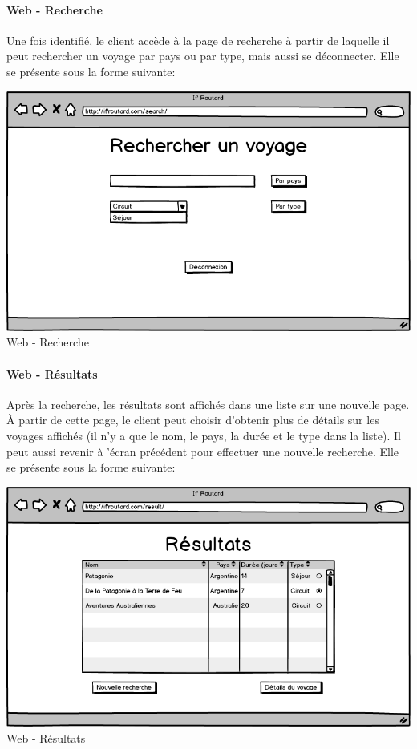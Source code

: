 \documentclass[11pt]{article}
\begin{document}
\paragraph{Web - Recherche}
Une fois identifié, le client accède à la page de recherche à partir de laquelle il peut rechercher un voyage par pays ou par type, mais aussi se déconnecter. Elle se présente sous la forme suivante:
\begin{center}
\includegraphics[scale = 0.4]{../Conception_graphique/png_Pour_CR/Web-20-Recherche.png}
\newline
Web - Recherche
\label{fig:Recherche}
\end{center}

\paragraph{Web - Résultats}
Après la recherche, les résultats sont affichés dans une liste sur une nouvelle page. À partir de cette page, le client peut choisir d'obtenir plus de détails sur les voyages affichés (il n'y a que le nom, le pays, la durée et le type dans la liste). Il peut aussi revenir à 'écran précédent pour effectuer une nouvelle recherche. Elle se présente sous la forme suivante:
\begin{center}
\includegraphics[scale = 0.4]{../Conception_graphique/png_Pour_CR/Web-30-Resultats.png}
\newline
Web - Résultats
\label{fig:Resultat}
\end{center}
\end{document}
